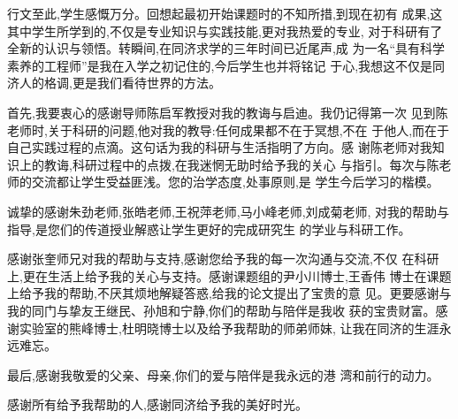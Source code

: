 \begin{ack}\fs
行文至此,学生感慨万分。回想起最初开始课题时的不知所措,到现在初有
成果,这其中学生所学到的,不仅是专业知识与实践技能,更对我热爱的专业,
对于科研有了全新的认识与领悟。转瞬间,在同济求学的三年时间已近尾声,成
为一名“具有科学素养的工程师”是我在入学之初记住的,今后学生也并将铭记
于心,我想这不仅是同济人的格调,更是我们看待世界的方法。

首先,我要衷心的感谢导师陈启军教授对我的教诲与启迪。我仍记得第一次
见到陈老师时,关于科研的问题,他对我的教导:任何成果都不在于冥想,不在
于他人,而在于自己实践过程的点滴。这句话为我的科研与生活指明了方向。感
谢陈老师对我知识上的教诲,科研过程中的点拨,在我迷惘无助时给予我的关心
与指引。每次与陈老师的交流都让学生受益匪浅。您的治学态度,处事原则,是
学生今后学习的楷模。

诚挚的感谢朱劲老师,张皓老师,王祝萍老师,马小峰老师,刘成菊老师,
对我的帮助与指导,是您们的传道授业解惑让学生更好的完成研究生
的学业与科研工作。

感谢张奎师兄对我的帮助与支持,感谢您给予我的每一次沟通与交流,不仅
在科研上,更在生活上给予我的关心与支持。感谢课题组的尹小川博士,王香伟
博士在课题上给予我的帮助,不厌其烦地解疑答惑,给我的论文提出了宝贵的意
见。更要感谢与我的同门与挚友王继民、孙旭和宁静,你们的帮助与陪伴是我收
获的宝贵财富。感谢实验室的熊峰博士,杜明晓博士以及给予我帮助的师弟师妹,
让我在同济的生涯永远难忘。

最后,感谢我敬爱的父亲、母亲,你们的爱与陪伴是我永远的港
湾和前行的动力。

感谢所有给予我帮助的人,感谢同济给予我的美好时光。

\ackdate
\end{ack}


